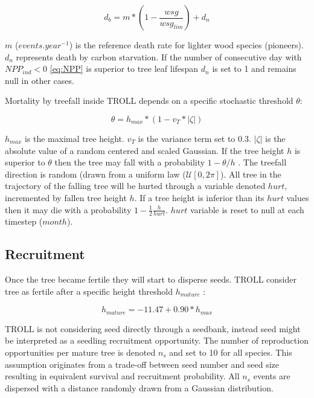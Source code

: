 \documentclass[12pt,]{article}
\theoremstyle{definition}
\theoremstyle{definition}
\theoremstyle{definition}
\theoremstyle{remark}
\begin{document}
\begin{equation}
  d_b = m*(1-\frac{wsg}{wsg_{lim}})+d_n
  \label{eq:db}
\end{equation}

\(m\) (\(events.year^{-1}\)) is the reference death rate for lighter
wood species (pioneers). \(d_n\) represents death by carbon starvation.
If the number of consecutive day with \(NPP_{ind}< 0\) \eqref{eq:NPP} is
superior to tree leaf lifespan \(d_n\) is set to 1 and remains null in
other cases.

Mortality by treefall inside TROLL depends on a specific stochastic
threshold \(\theta\):

\begin{equation}
  \theta = h_{max}*(1-v_T*|\zeta|)
  \label{eq:theta}
\end{equation}

\(h_{max}\) is the maximal tree height. \(v_T\) is the variance term set
to 0.3. \(|\zeta|\) is the absolute value of a random centered and
scaled Gaussian. If the tree height \(h\) is superior to \(\theta\) then
the tree may fall with a probability \(1-\theta/h\) \citep{Chave1999b}.
The treefall direction is random (drawn from a uniform law
(\(\mathcal{U}[0,2\pi]\)). All tree in the trajectory of the falling
tree will be hurted through a variable denoted \(hurt\), incremented by
fallen tree height \(h\). If a tree height is inferior than its \(hurt\)
values then it may die with a probability
\(1-\frac{1}{2}\frac{h}{hurt}\). \(hurt\) variable is reset to null at
each timestep (\(month\)).

\subsection{Recruitment}\label{recruitment}

Once the tree became fertile they will start to disperse seeds. TROLL
consider tree as fertile after a specific height threshold
\(h_{mature}\) \citep{Wright2005}:

\begin{equation}
  h_{mature} = -11.47+0.90*h_{max}
  \label{eq:hmature}
\end{equation}

TROLL is not considering seed directly through a seedbank, instead seed
might be interpreted as a seedling recruitment opportunity. The number
of reproduction opportunities per mature tree is denoted \(n_s\) and set
to 10 for all species. This assumption originates from a trade-off
between seed number and seed size resulting in equivalent survival and
recruitment probability. All \(n_s\) events are dispersed with a
distance randomly drawn from a Gaussian distribution.
\end{document}
